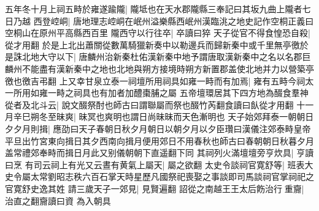五年冬十月上祠五畤於雍遂踰隴|{
	隴坻也在天水郡隴縣三奉記曰其坂九曲上隴者七日乃越}
西登崆峒|{
	唐地理志崆峒在岷州溢樂縣西岷州漢臨洮之地史記作空桐正義曰空桐山在原州平高縣西百里}
隴西守以行往卒|{
	卒讀曰猝}
天子從官不得食惶恐自殺|{
	從才用翻}
於是上北出蕭關從數萬騎獵新奏中以勒邊兵而歸新秦中或千里無亭徼於是誅北地大守以下|{
	唐麟州治新秦杜佑漢新秦中地予謂唐取漢新秦中之名以名郡巨麟州不能盡有漢新秦中之地也北地與朔方接境時朔方新置郡盖使北地并力以營築亭徼也徼吉弔翻}
上又幸甘泉立泰一祠壇所用祠具如雍一畤而有加焉|{
	雍有五畤今祠太一所用如雍一畤之祠具也有加者加醴棗脯之屬}
五帝壇環居其下四方地為醊食羣神從者及北斗云|{
	說文醊祭酎也師古曰謂聯屬而祭也醊竹芮翻食讀曰飤從才用翻}
十一月辛巳朔冬至昧爽|{
	昧冥也爽明也謂日尚昧昧而天色漸明也}
天子始郊拜泰一朝朝日夕夕月則揖|{
	應劭曰天子春朝日秋夕月朝日以朝夕月以夕臣瓚曰漢儀注郊泰畤皇帝平旦出竹宮東向揖日其夕西南向揖月便用郊日不用春秋也師古曰春朝朝日秋暮夕月盖常禮郊奉畤而揖日月此又别儀朝朝下直遥翻下同}
其祠列火滿壇壇旁亨炊具|{
	亨讀曰烹}
有司云祠上有光又云晝有黄氣上屬天|{
	屬之欲翻}
太史令談祠官寛舒等|{
	班表大史令屬太常劉昭志秩六百石掌天時星歷凡國祭祀喪娶之事談即司馬談祠官掌祠祀之官寛舒史逸其姓}
請三歲天子一郊見|{
	見賢遍翻}
詔從之南越王王太后飭治行重齎|{
	治直之翻齎讀曰資}
為入朝具

